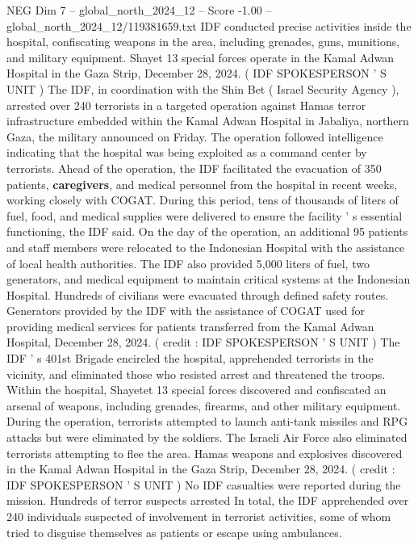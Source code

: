 \begin{textsample}{NEG Dim 7 – global\_north\_2024\_12 – Score -1.00 – global\_north\_2024\_12/119381659.txt}  \label{ex:f7_neg_162}
IDF conducted precise activities inside the hospital, confiscating weapons in the area, including grenades, guns, munitions, and military equipment.
Shayet 13 special forces operate in the Kamal Adwan Hospital in the Gaza Strip, December 28, 2024. ( IDF SPOKESPERSON ' S UNIT ) The IDF, in coordination with the Shin Bet ( Israel Security Agency ), arrested over 240 terrorists in a targeted operation against Hamas terror infrastructure embedded within the Kamal Adwan Hospital in Jabaliya, northern Gaza, the military announced on Friday.
The operation followed intelligence indicating that the hospital was being exploited as a command center by terrorists.
Ahead of the operation, the IDF facilitated the evacuation of 350 patients, \textbf{caregivers}, and medical personnel from the hospital in recent weeks, working closely with COGAT.
During this period, tens of thousands of liters of fuel, food, and medical supplies were delivered to ensure the facility ' s essential functioning, the IDF said.
On the day of the operation, an additional 95 patients and staff members were relocated to the Indonesian Hospital with the assistance of local health authorities.
The IDF also provided 5,000 liters of fuel, two generators, and medical equipment to maintain critical systems at the Indonesian Hospital.
Hundreds of civilians were evacuated through defined safety routes.
Generators provided by the IDF with the assistance of COGAT used for providing medical services for patients transferred from the Kamal Adwan Hospital, December 28, 2024. ( credit : IDF SPOKESPERSON ' S UNIT ) The IDF ' s 401st Brigade encircled the hospital, apprehended terrorists in the vicinity, and eliminated those who resisted arrest and threatened the troops.
Within the hospital, Shayetet 13 special forces discovered and confiscated an arsenal of weapons, including grenades, firearms, and other military equipment.
During the operation, terrorists attempted to launch anti-tank missiles and RPG attacks but were eliminated by the soldiers.
The Israeli Air Force also eliminated terrorists attempting to flee the area.
Hamas weapons and explosives discovered in the Kamal Adwan Hospital in the Gaza Strip, December 28, 2024. ( credit : IDF SPOKESPERSON ' S UNIT ) No IDF casualties were reported during the mission.
Hundreds of terror suspects arrested In total, the IDF apprehended over 240 individuals suspected of involvement in terrorist activities, some of whom tried to disguise themselves as patients or escape using ambulances.

\end{textsample}
